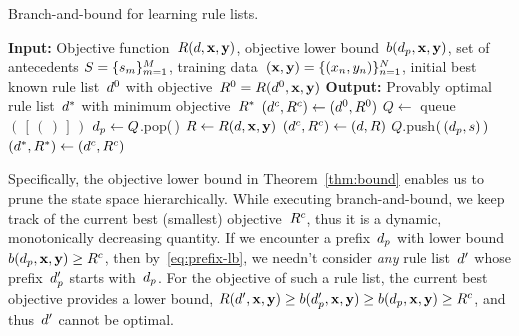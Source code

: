 \begin{algorithm}[t!]
\caption{Branch-and-bound for learning rule lists.}
\label{alg:branch-and-bound}
\begin{algorithmic}
\normalsize
\State \textbf{Input:} Objective function~$R({d}, \mathbf{x}, \mathbf{y})$,
objective lower bound~${b(d_p, \mathbf{x}, \mathbf{y})}$,
set of antecedents ${S = \{s_m\}_{m=1}^M}$,
training data~$(\mathbf{x}, \mathbf{y}) = {\{(x_n, y_n)\}_{n=1}^N}$,
initial best known rule list~$d^0$ with objective~${R^0 = R(d^0, \mathbf{x}, \mathbf{y})}$
\State \textbf{Output:} Provably optimal rule list~$d^*$ with minimum objective~$R^*$
\State $(d^c, {R^c}) \gets (d^0, R^0)$ 
\State $Q \gets $ queue$(\,[\,(\,)\,]\,)$ 
 
	\State $d_p \gets Q$.pop(\,) 
	 
        \State $R \gets R({d}, \mathbf{x}, \mathbf{y})$ 
        \If {$\Obj < \CurrentObj$}
            \State $(d^c, {R^c}) \gets ({d}, R)$ 
        \EndIf
             
                \State $Q$.push$(\,(d_p, s)\,)$ 
            \EndIf
        \EndFor
    \EndIf
\EndWhile
\State $(d^*, R^*) \gets (d^c, {R^c})$ 
\end{algorithmic}
\end{algorithm}

Specifically, the objective lower bound in Theorem~\ref{thm:bound}
enables us to prune the state space hierarchically.
%
While executing branch-and-bound, we keep track of the current best (smallest)
objective~${R^c}$, thus it is a dynamic, monotonically decreasing quantity.
%
If we encounter a prefix~$d_p$ with lower bound
${b(d_p, \mathbf{x}, \mathbf{y}) \ge {R^c}}$,
then by~\eqref{eq:prefix-lb}, we needn't consider \emph{any}
rule list~${d}'$ whose prefix~$d_p'$ starts with~$d_p$.
%
For the objective of such a rule list, the current best objective
provides a lower bound, \ie
${R({d}', \mathbf{x}, \mathbf{y}) \ge b(d_p', \mathbf{x}, \mathbf{y}) \ge b(d_p, \mathbf{x}, \mathbf{y}) \ge {R^c}}$,
and thus~${d}'$ cannot be optimal. \\

